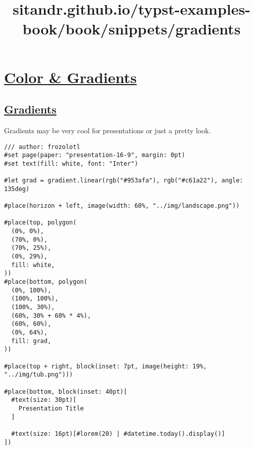 \title{sitandr.github.io/typst-examples-book/book/snippets/gradients}

\section{\texorpdfstring{\hyperref[color--gradients]{Color \&
Gradients}}{Color \& Gradients}}\label{color--gradients}

\subsection{\texorpdfstring{\hyperref[gradients]{Gradients}}{Gradients}}\label{gradients}

Gradients may be very cool for presentations or just a pretty look.

\begin{verbatim}
/// author: frozolotl
#set page(paper: "presentation-16-9", margin: 0pt)
#set text(fill: white, font: "Inter")

#let grad = gradient.linear(rgb("#953afa"), rgb("#c61a22"), angle: 135deg)

#place(horizon + left, image(width: 60%, "../img/landscape.png"))

#place(top, polygon(
  (0%, 0%),
  (70%, 0%),
  (70%, 25%),
  (0%, 29%),
  fill: white,
))
#place(bottom, polygon(
  (0%, 100%),
  (100%, 100%),
  (100%, 30%),
  (60%, 30% + 60% * 4%),
  (60%, 60%),
  (0%, 64%),
  fill: grad,
))

#place(top + right, block(inset: 7pt, image(height: 19%, "../img/tub.png")))

#place(bottom, block(inset: 40pt)[
  #text(size: 30pt)[
    Presentation Title
  ]

  #text(size: 16pt)[#lorem(20) | #datetime.today().display()]
])
\end{verbatim}

\pandocbounded{}
